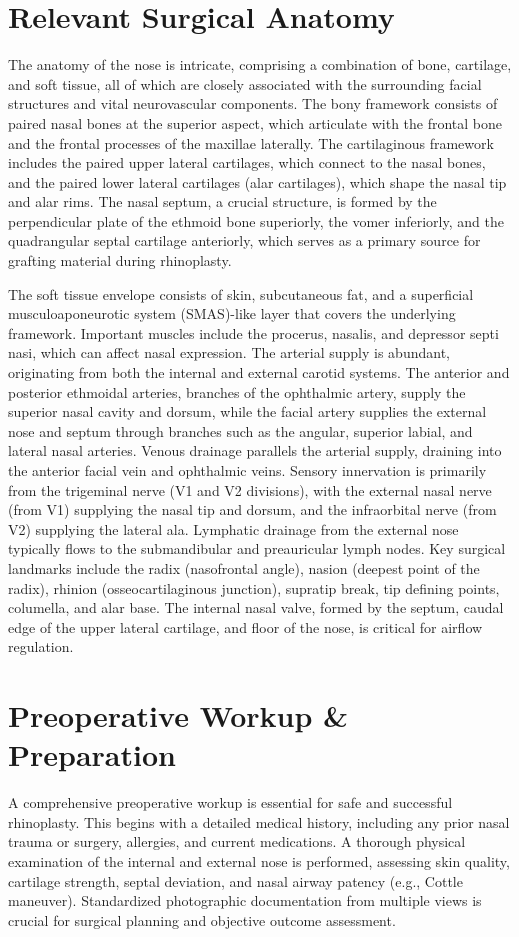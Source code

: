 \section*{Relevant Surgical Anatomy}
The anatomy of the nose is intricate, comprising a combination of bone, cartilage, and soft tissue, all of which are closely associated with the surrounding facial structures and vital neurovascular components. The bony framework consists of paired nasal bones at the superior aspect, which articulate with the frontal bone and the frontal processes of the maxillae laterally. The cartilaginous framework includes the paired upper lateral cartilages, which connect to the nasal bones, and the paired lower lateral cartilages (alar cartilages), which shape the nasal tip and alar rims. The nasal septum, a crucial structure, is formed by the perpendicular plate of the ethmoid bone superiorly, the vomer inferiorly, and the quadrangular septal cartilage anteriorly, which serves as a primary source for grafting material during rhinoplasty.

The soft tissue envelope consists of skin, subcutaneous fat, and a superficial musculoaponeurotic system (SMAS)-like layer that covers the underlying framework. Important muscles include the procerus, nasalis, and depressor septi nasi, which can affect nasal expression. The arterial supply is abundant, originating from both the internal and external carotid systems. The anterior and posterior ethmoidal arteries, branches of the ophthalmic artery, supply the superior nasal cavity and dorsum, while the facial artery supplies the external nose and septum through branches such as the angular, superior labial, and lateral nasal arteries. Venous drainage parallels the arterial supply, draining into the anterior facial vein and ophthalmic veins. Sensory innervation is primarily from the trigeminal nerve (V1 and V2 divisions), with the external nasal nerve (from V1) supplying the nasal tip and dorsum, and the infraorbital nerve (from V2) supplying the lateral ala. Lymphatic drainage from the external nose typically flows to the submandibular and preauricular lymph nodes. Key surgical landmarks include the radix (nasofrontal angle), nasion (deepest point of the radix), rhinion (osseocartilaginous junction), supratip break, tip defining points, columella, and alar base. The internal nasal valve, formed by the septum, caudal edge of the upper lateral cartilage, and floor of the nose, is critical for airflow regulation.

\section*{Preoperative Workup \& Preparation}
A comprehensive preoperative workup is essential for safe and successful rhinoplasty. This begins with a detailed medical history, including any prior nasal trauma or surgery, allergies, and current medications. A thorough physical examination of the internal and external nose is performed, assessing skin quality, cartilage strength, septal deviation, and nasal airway patency (e.g., Cottle maneuver). Standardized photographic documentation from multiple views is crucial for surgical planning and objective outcome assessment.

